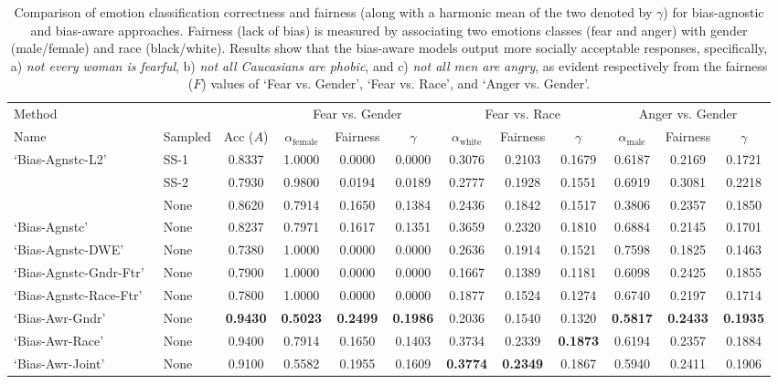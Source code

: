 \documentclass[letterpaper]{article}
\newcommand{\STWR}{`Bias-Agnstc-L2'~}
\newcommand{\STWOR}{`Bias-Agnstc'~}
\newcommand{\STWRG}{`Bias-Agnstc-Gndr-Ftr'~}
\newcommand{\STWRR}{`Bias-Agnstc-Race-Ftr'~}
\newcommand{\STWRDW}{`Bias-Agnstc-DWE'~}
\newcommand{\MTLG}{`Bias-Awr-Gndr'~}
\newcommand{\MTLR}{`Bias-Awr-Race'~}
\newcommand{\MTLB}{`Bias-Awr-Joint'~}
\begin{document}
\begin{table}[t]
\centering
\small
\begin{tabular}{l@{~~}l@{~~}c@{~~~~}c@{~~}c@{~~}c@{~~~~}c@{~~}c@{~~}c@{~~~~}c@{~~}c@{~~}c} 
\toprule
Method & &  &\multicolumn{3}{c}{Fear vs. Gender}  &  \multicolumn{3}{c}{Fear vs. Race} & \multicolumn{3}{c}{Anger vs. Gender}   \\
\cmidrule(r){4-6}
\cmidrule(r){7-9}
\cmidrule(r){10-12}
Name & Sampled & Acc ($A$)  & $\alpha_{\mathrm{female}}$& Fairness & $\gamma$  & $\alpha_{\mathrm{white}}$ & Fairness & $\gamma$ &   $\alpha_{\mathrm{male}}$ & Fairness & $\gamma$  \\
\midrule
\multirow{3}{*}{\STWR} & SS-1 &  0.8337 &1.0000& 0.0000 & 0.0000 &0.3076& 0.2103&0.1679 &0.6187& 0.2169 & 0.1721\\
& SS-2 &  0.7930 &0.9800& 0.0194& 0.0189 &0.2777& 0.1928 &0.1551& 0.6919 & 0.3081 & 0.2218 \\
& None & 0.8620 & 0.7914 & 0.1650 & 0.1384 & 0.2436&0.1842 &0.1517&0.3806 & 0.2357 & 0.1850 \\
\midrule
\STWOR & None &  0.8237 & 0.7971 &0.1617 & 0.1351 & 0.3659& 0.2320 &0.1810 &0.6884 & 0.2145 & 0.1701\\
\STWRDW & None & 0.7380 & 1.0000 &0.0000 & 0.0000 & 0.2636&0.1914 &0.1521&0.7598 & 0.1825 & 0.1463\\
\STWRG & None & 0.7900 & 1.0000 & 0.0000 & 0.0000 & 0.1667&0.1389 & 0.1181 &0.6098& 0.2425 & 0.1855\\
\STWRR & None  &0.7800 &1.0000 & 0.0000 & 0.0000 &0.1877& 0.1524 & 0.1274 &0.6740& 0.2197 & 0.1714\\
\midrule
\MTLG & None & \textbf{0.9430} &\textbf{0.5023} &\textbf{0.2499} & \textbf{0.1986} & 0.2036&0.1540 & 0.1320 & \textbf{0.5817} &\textbf{0.2433} & \textbf{0.1935}\\
\MTLR & None & 0.9400 & 0.7914 &0.1650 & 0.1403 &0.3734& 0.2339 & \textbf{0.1873} &0.6194 &0.2357 & 0.1884\\
\MTLB& None & 0.9100 & 0.5582 &0.1955 & 0.1609 & \textbf{0.3774} & \textbf{0.2349} & 0.1867&0.5940 & 0.2411 & 0.1906\\
\bottomrule
\end{tabular}
\caption{Comparison of emotion classification correctness and fairness (along with a harmonic mean of the two denoted by $\gamma$) for bias-agnostic and bias-aware approaches. Fairness (lack of bias) is measured by associating two emotions classes (fear and anger)
with gender (male/female) and race (black/white). Results show that the bias-aware models output more socially acceptable responses, specifically, a) \emph{not every woman is fearful}, b) \emph{not all Caucasians are phobic}, and c) \emph{not all men are angry}, as evident respectively from the fairness ($F$) values of `Fear vs. Gender', `Fear vs. Race', and `Anger vs. Gender'.}
\label{tab:results}
\end{table}
\end{document}
